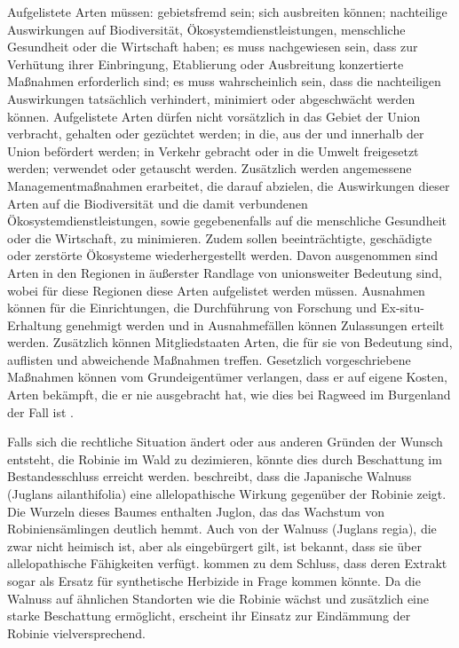 \documentclass[twocolumn]{scrartcl}
\begin{document}
Aufgelistete
Arten müssen: gebietsfremd sein; sich ausbreiten können; nachteilige
Auswirkungen auf Biodiversität, Ökosystemdienstleistungen, menschliche
Gesundheit oder die Wirtschaft haben; es muss nachgewiesen sein, dass zur
Verhütung ihrer Einbringung, Etablierung oder Ausbreitung konzertierte Maßnahmen
erforderlich sind; es muss wahrscheinlich sein, dass die nachteiligen
Auswirkungen tatsächlich verhindert, minimiert oder abgeschwächt werden können.
Aufgelistete Arten dürfen nicht vorsätzlich in das Gebiet der Union verbracht,
gehalten oder gezüchtet werden; in die, aus der und innerhalb der Union
befördert werden; in Verkehr gebracht oder in die Umwelt freigesetzt werden;
verwendet oder getauscht werden. Zusätzlich werden angemessene
Managementmaßnahmen erarbeitet, die darauf abzielen, die Auswirkungen dieser
Arten auf die Biodiversität und die damit verbundenen Ökosystemdienstleistungen,
sowie gegebenenfalls auf die menschliche Gesundheit oder die Wirtschaft, zu
minimieren. Zudem sollen beeinträchtigte, geschädigte oder zerstörte Ökosysteme
wiederhergestellt werden. Davon ausgenommen sind Arten in den Regionen in
äußerster Randlage von unionsweiter Bedeutung sind, wobei für diese Regionen
diese Arten aufgelistet werden müssen. Ausnahmen können für die Einrichtungen,
die Durchführung von Forschung und Ex-situ-Erhaltung genehmigt werden und in
Ausnahmefällen können Zulassungen erteilt werden. Zusätzlich können
Mitgliedstaaten Arten, die für sie von Bedeutung sind, auflisten und abweichende
Maßnahmen treffen. Gesetzlich vorgeschriebene Maßnahmen können vom
Grundeigentümer verlangen, dass er auf eigene Kosten, Arten bekämpft, die er
nie ausgebracht hat, wie dies bei Ragweed im Burgenland der Fall ist
\citep{burgenland2021ragweed}.

Falls sich die rechtliche Situation ändert oder aus anderen Gründen
der Wunsch entsteht, die Robinie im Wald zu dezimieren, könnte dies
durch Beschattung im Bestandesschluss erreicht
werden. \citet{jung2010robinie} beschreibt, dass die Japanische
Walnuss (Juglans ailanthifolia) eine allelopathische Wirkung gegenüber
der Robinie zeigt. Die Wurzeln dieses Baumes enthalten Juglon, das das
Wachstum von Robiniensämlingen deutlich hemmt. Auch von der Walnuss
(Juglans regia), die zwar nicht heimisch ist, aber als eingebürgert
gilt, ist bekannt, dass sie über allelopathische Fähigkeiten
verfügt. \citet{dordevic2022nussAllelopathi} kommen zu dem Schluss,
dass deren Extrakt sogar als Ersatz für synthetische Herbizide in
Frage kommen könnte. Da die Walnuss auf ähnlichen Standorten wie die
Robinie wächst und zusätzlich eine starke Beschattung ermöglicht,
erscheint ihr Einsatz zur Eindämmung der Robinie vielversprechend.
\end{document}
